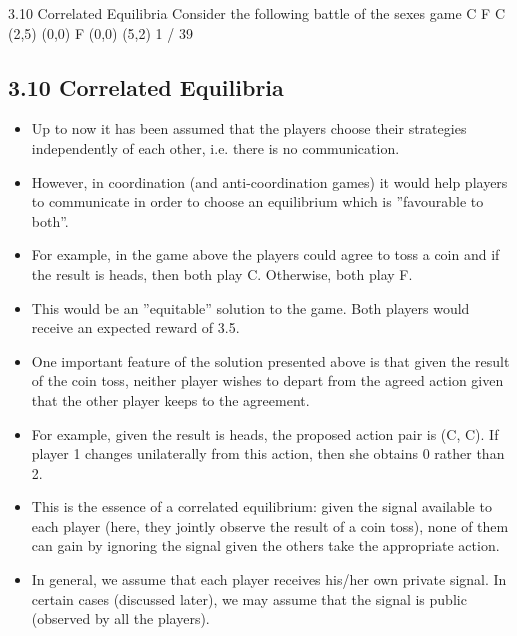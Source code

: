 \documentclass[]{report}
\begin{document}
	
3.10 Correlated Equilibria
Consider the following battle of the sexes game
C F
C (2,5) (0,0)
F (0,0) (5,2)
1 / 39

\subsection{3.10 Correlated Equilibria}
\begin{itemize}
\item Up to now it has been assumed that the players choose their
strategies independently of each other, i.e. there is no
communication.
\item However, in coordination (and anti-coordination games) it would
help players to communicate in order to choose an equilibrium
which is ”favourable to both”.
\item For example, in the game above the players could agree to toss a
coin and if the result is heads, then both play C. Otherwise, both
play F.
\item This would be an ”equitable” solution to the game. Both players
would receive an expected reward of 3.5.
\end{itemize}

\begin{itemize}
\item One important feature of the solution presented above is that given
the result of the coin toss, neither player wishes to depart from the
agreed action given that the other player keeps to the agreement.
\item For example, given the result is heads, the proposed action pair is
(C, C). If player 1 changes unilaterally from this action, then she
obtains 0 rather than 2.
\item This is the essence of a correlated equilibrium: given the signal
available to each player (here, they jointly observe the result of a
coin toss), none of them can gain by ignoring the signal given the
others take the appropriate action.
\item In general, we assume that each player receives his/her own private
signal. In certain cases (discussed later), we may assume that the
signal is public (observed by all the players).
\end{itemize}


\end{document}
